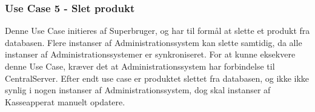 \subsubsection{Use Case 5 - Slet produkt}
Denne Use Case initieres af Superbruger, og har til formål at slette et produkt fra databasen. Flere instanser af Administrationssystem kan slette samtidig, da alle instanser af Administrationssystemer er synkroniseret. For at kunne eksekvere denne Use Case, kræver det at Administrationssystem har forbindelse til CentralServer. Efter endt use case er produktet slettet fra databasen, og ikke ikke synlig i nogen instanser af Administrationssystem, dog skal instanser af Kasseapperat manuelt opdatere.